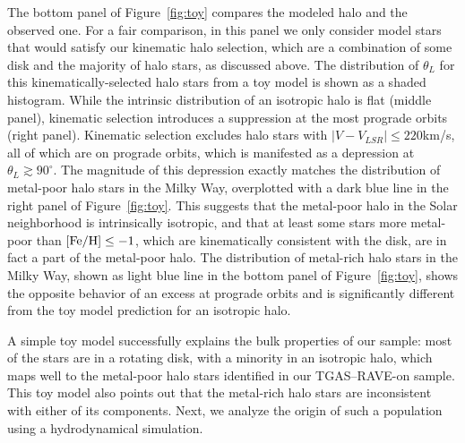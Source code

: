 \documentclass[apj, twocolappendix, numberedappendix, appendixfloats]{emulateapj}
\begin{document}
The bottom panel of Figure~\ref{fig:toy} compares the modeled halo and the observed one.
For a fair comparison, in this panel we only consider model stars that would satisfy our kinematic halo selection, which are a combination of some disk and the majority of halo stars, as discussed above.
The distribution of $\theta_L$ for this kinematically-selected halo stars from a toy model is shown as a shaded histogram.
While the intrinsic distribution of an isotropic halo is flat (middle panel), kinematic selection introduces a suppression at the most prograde orbits (right panel).
Kinematic selection excludes halo stars with $|V-V_{LSR}|\leq220$\;km/s, all of which are on prograde orbits, which is manifested as a depression at $\theta_L\gtrsim90^\circ$.
The magnitude of this depression exactly matches the distribution of metal-poor halo stars in the Milky Way, overplotted with a dark blue line in the right panel of Figure~\ref{fig:toy}.
This suggests that the metal-poor halo in the Solar neighborhood is intrinsically isotropic, and that at least some stars more metal-poor than $\rm[Fe/H]\leq-1$, which are kinematically consistent with the disk, are in fact a part of the metal-poor halo.
The distribution of metal-rich halo stars in the Milky Way, shown as light blue line in the bottom panel of Figure~\ref{fig:toy}, shows the opposite behavior of an excess at prograde orbits and is significantly different from the toy model prediction for an isotropic halo.

A simple toy model successfully explains the bulk properties of our sample: most of the stars are in a rotating disk, with a minority in an isotropic halo, which maps well to the metal-poor halo stars identified in our TGAS--RAVE-on sample.
This toy model also points out that the metal-rich halo stars are inconsistent with either of its components.
Next, we analyze the origin of such a population using a hydrodynamical simulation.
\end{document}

